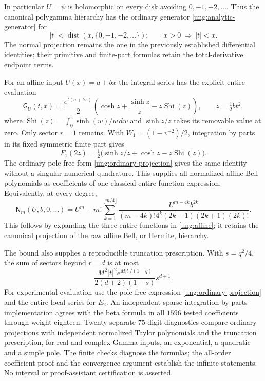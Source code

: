 In particular $U=\psi$ is holomorphic on every disk avoiding
$0,-1,-2,\ldots$. Thus the canonical polygamma hierarchy has the
ordinary generator \eqref{ung:analytic-generator} for
\[
 |t|<\operatorname{dist}(x,\{0,-1,-2,\ldots\});
 \qquad x>0\ \Longrightarrow\ |t|<x.
\]
The normal projection remains the one in the previously established
differential identities; their primitive and finite-part formulas
retain the total-derivative endpoint terms.

For an affine input $U(x)=a+bx$ the integral series has the explicit
entire evaluation
\begin{equation}\label{ung:affine}
 \boxed{\mathsf G_U(t,x)=\frac{e^{t(a+bx)}}2
   \left(\cosh z+\frac{\sinh z}{z}-z\operatorname{Shi}(z)\right),
 \qquad z=\tfrac12bt^2,}
\end{equation}
where $\operatorname{Shi}(z)=\int_0^z\sinh(w)/w\,dw$ and
$\sinh z/z$ takes its removable value at zero. Only sector $r=1$
remains. With $W_1=(1-v^{-2})/2$, integration by parts in its fixed
symmetric finite part gives
\[
 F_1(2z)=\tfrac12\bigl(\sinh z/z+\cosh z-z\operatorname{Shi}(z)\bigr).
\]
The ordinary pole-free form \eqref{ung:ordinary-projection} gives the
same identity without a singular numerical quadrature. This supplies
all normalized affine Bell polynomials as coefficients of one
classical entire-function expression.
Equivalently, at every degree,
\begin{equation}\label{ung:affine-coefficients}
 \mathsf N_m(U,b,0,\ldots)=U^m-m!\sum_{k=1}^{\lfloor m/4\rfloor}
 \frac{U^{m-4k}b^{2k}}
 {(m-4k)!4^k(2k-1)(2k+1)(2k)!}.
\end{equation}
This follows by expanding the three entire functions in
\eqref{ung:affine}; it retains the canonical projection of the raw
affine Bell, or Hermite, hierarchy.

The bound also supplies a reproducible truncation prescription.
With $s=q^2/4$, the sum of sectors beyond $r=d$ is at most
\[
 \frac{M^2|t|^2e^{M|t|/(1-q)}}{2(d+2)(1-s)}s^{d+1}.
\]
For experimental evaluation use the pole-free expression
\eqref{ung:ordinary-projection} and the entire local series for $E_2$.
An independent sparse integration-by-parts implementation agrees with
the beta formula in all $1596$ tested coefficients through weight
eighteen. Twenty separate $75$-digit diagnostics compare ordinary
projections with independent normalized Taylor polynomials and the
truncation prescription, for real and complex Gamma inputs, an
exponential, a quadratic and a simple pole. The finite checks diagnose
the formulas; the all-order coefficient proof and the convergence
argument establish the infinite statements. No interval or
proof-assistant certification is asserted.

